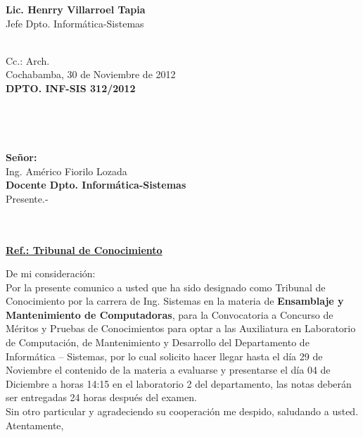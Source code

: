 \documentclass[letterpaper,11pt]{letter}
\begin{document}
\vspace{3.5cm}
\begin{center}
\begin{minipage}[b]{0.5\textwidth}
\begin{center}
{\bf Lic. Henrry Villarroel Tapia}\\
Jefe Dpto. Informática-Sistemas\\
\end{center}
\end{minipage}
\end{center}
~\\
Cc.: Arch.\\
\newpage
Cochabamba, 30 de Noviembre de 2012~\\
 \textbf{DPTO. INF-SIS 312/2012}\\
~\\
~\\
~\\
~\\
 \textbf{Señor:}~\\
Ing. Américo Fiorilo Lozada~\\
 \textbf{Docente Dpto. Informática-Sistemas}~\\
Presente.-\\
~\\
~\\
\begin{center}
\underline{ \textbf{Ref.: Tribunal de Conocimiento}}
\end{center}
De mi consideración:\\
Por la presente comunico a usted que ha sido designado como Tribunal de Conocimiento por la carrera de Ing. Sistemas en la materia de \textbf{Ensamblaje y Mantenimiento de Computadoras}, para la Convocatoria a Concurso de Méritos y Pruebas de Conocimientos para optar a las Auxiliatura en Laboratorio de Computación, de Mantenimiento y Desarrollo del Departamento de Informática – Sistemas, por lo cual solicito hacer llegar hasta el día 29 de Noviembre el contenido de la materia a evaluarse y presentarse el día 04 de Diciembre a horas 14:15 en el laboratorio 2 del departamento, las notas deberán ser entregadas 24 horas después del examen.\\
Sin otro particular y agradeciendo su cooperación me despido, saludando a usted.\\
Atentamente,\\
\end{document}
